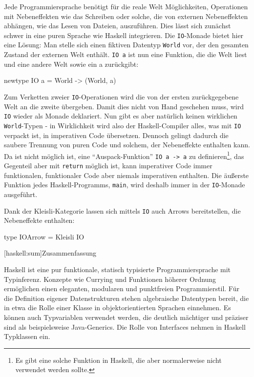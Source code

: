 \documentclass[11pt, a4paper, bibgerm]{scrbook}
\newcommand\icode[1]{\lstinline?#1?}
\newcommand\lsection{}
\begin{document}
Jede Programmiersprache benötigt für die reale Welt Möglichkeiten,
Operationen mit Nebeneffekten wie das Schreiben oder solche, die von
externen Nebeneffekten abhängen, wie das Lesen von Dateien,
auszuführen. Dies lässt sich zunächst schwer in eine puren Sprache wie
Haskell integrieren. Die \icode{IO}-Monade bietet hier eine Lösung: Man
stelle sich einen fiktiven Datentyp \icode{World} vor, der den gesamten
Zustand der externen Welt enthält. \icode{IO a} ist nun eine Funktion,
die die Welt liest und eine andere Welt sowie ein a zurückgibt:
\begin{code}
newtype IO a = World -> (World, a)
\end{code}
Zum Verketten zweier \icode{IO}-Operationen wird die von der ersten
zurückgegebene Welt an die zweite übergeben. Damit dies nicht von Hand
geschehen muss, wird \icode{IO} wieder als Monade deklariert. Nun gibt
es aber natürlich keinen wirklichen \icode{World}-Typen - in
Wirklichkeit wird also der Haskell-Compiler alles, was mit \icode{IO}
verpackt ist, in imperativen Code übersetzen. Dennoch gelingt dadurch
die saubere Trennung von puren Code und solchem, der Nebeneffekte
enthalten kann. Da ist nicht möglich ist, eine "`Auspack-Funktion"'
\icode{IO a -> a} zu definieren\footnote{Es gibt eine solche Funktion in
  Haskell, die aber normalerweise nicht verwendet werden sollte.}, das
Gegenteil aber mit \icode{return} möglich ist, kann imperativer Code
immer funktionalen, funktionaler Code aber niemals imperativen
enthalten. Die äußerste Funktion jedes Haskell-Programms, \icode{main},
wird deshalb immer in der \icode{IO}-Monade ausgeführt.

Dank der Kleisli-Kategorie lassen sich mittels \icode{IO} auch Arrows
bereitstellen, die Nebeneffekte enthalten:
\begin{code}
type IOArrow = Kleisli IO
\end{code}

\lsection[haskell:sum]{Zusammenfassung}

Haskell ist eine pur funktionale, statisch typisierte Programmiersprache
mit Typinferenz. Konzepte wie Currying und Funktionen höherer Ordnung
ermöglichen einen eleganten, modularen und punktfreien
Programmierstil. Für die Definition eigener Datenstrukturen stehen
algebraische Datentypen bereit, die in etwa die Rolle einer Klasse in
objektorientierten Sprachen einnehmen. Es können auch Typvariablen
verwendet werden, die deutlich mächtiger und präziser sind als
beispielsweise Java-Generics\cite{JavaGenerics}. Die Rolle von
Interfaces nehmen in Haskell Typklassen ein.
\end{document}
